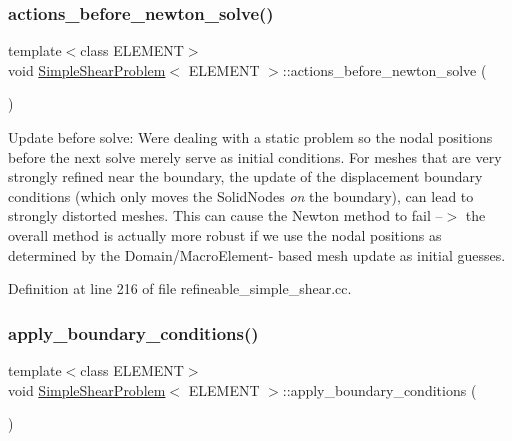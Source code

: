 \subsubsection{\texorpdfstring{actions\+\_\+before\+\_\+newton\+\_\+solve()}{actions\_before\_newton\_solve()}\hspace{0.1cm}{\footnotesize\ttfamily [2/2]}}
{\footnotesize\ttfamily template$<$class E\+L\+E\+M\+E\+NT$>$ \\
void \hyperlink{classSimpleShearProblem}{Simple\+Shear\+Problem}$<$ E\+L\+E\+M\+E\+NT $>$\+::actions\+\_\+before\+\_\+newton\+\_\+solve (\begin{DoxyParamCaption}{ }\end{DoxyParamCaption})\hspace{0.3cm}{\ttfamily [inline]}}



Update before solve\+: We\textquotesingle{}re dealing with a static problem so the nodal positions before the next solve merely serve as initial conditions. For meshes that are very strongly refined near the boundary, the update of the displacement boundary conditions (which only moves the Solid\+Nodes {\itshape on} the boundary), can lead to strongly distorted meshes. This can cause the Newton method to fail --$>$ the overall method is actually more robust if we use the nodal positions as determined by the Domain/\+Macro\+Element-\/ based mesh update as initial guesses. 



Definition at line 216 of file refineable\+\_\+simple\+\_\+shear.\+cc.

\mbox{\label{classSimpleShearProblem_a1069985934b36d269b4bc8cb3ba00902}} 
\subsubsection{\texorpdfstring{apply\+\_\+boundary\+\_\+conditions()}{apply\_boundary\_conditions()}\hspace{0.1cm}{\footnotesize\ttfamily [1/2]}}
{\footnotesize\ttfamily template$<$class E\+L\+E\+M\+E\+NT$>$ \\
void \hyperlink{classSimpleShearProblem}{Simple\+Shear\+Problem}$<$ E\+L\+E\+M\+E\+NT $>$\+::apply\+\_\+boundary\+\_\+conditions (\begin{DoxyParamCaption}{ }\end{DoxyParamCaption})\hspace{0.3cm}{\ttfamily [inline]}}



